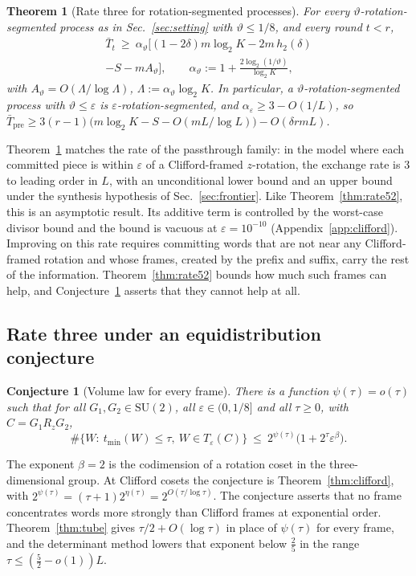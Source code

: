\documentclass[aps,prx,twocolumn,superscriptaddress,nofootinbib,longbibliography]{revtex4-2}
\theoremstyle{plain}
\newtheorem{theorem}{Theorem}
\newtheorem{conjecture}{Conjecture}
\theoremstyle{definition}
\theoremstyle{remark}
\newcommand{\Tpre}{T_{\mathrm{pre}}}
\newcommand{\SU}{\mathrm{SU}(2)}
\begin{document}
\begin{theorem}[Rate three for rotation-segmented processes]\label{thm:rate3seg}
For every $\vartheta$-rotation-segmented process as in Sec.~\ref{sec:setting} with $\vartheta\le1/8$, and every round $t<r$,
\begin{multline}\label{eq:rate3seg}
\bar T_t\ \ge\ \alpha_\vartheta\big[(1-2\delta)m\log_2K-2m\,h_2(\delta)\\-S-mA_\vartheta\big],\qquad\alpha_\vartheta:=1+\frac{2\log_2(1/\vartheta)}{\log_2K},
\end{multline}
with $A_\vartheta=O(\Lambda/\log\Lambda)$, $\Lambda:=\alpha_\vartheta\log_2K$. In particular, a $\vartheta$-rotation-segmented process with $\vartheta\le\varepsilon$ is $\varepsilon$-rotation-segmented, and $\alpha_\varepsilon\ge3-O(1/L)$, so $\bar\Tpre\ge3(r-1)\big(m\log_2K-S-O(mL/\log L)\big)-O(\delta rmL)$.
\end{theorem}
Theorem~\ref{thm:rate3seg} matches the rate of the passthrough family: in the model where each committed piece is within $\varepsilon$ of a Clifford-framed $z$-rotation, the exchange rate is $3$ to leading order in $L$, with an unconditional lower bound and an upper bound under the synthesis hypothesis of Sec.~\ref{sec:frontier}. Like Theorem~\ref{thm:rate52}, this is an asymptotic result. Its additive term is controlled by the worst-case divisor bound and the bound is vacuous at $\varepsilon=10^{-10}$ (Appendix~\ref{app:clifford}). Improving on this rate requires committing words that are not near any Clifford-framed rotation and whose frames, created by the prefix and suffix, carry the rest of the information. Theorem~\ref{thm:rate52} bounds how much such frames can help, and Conjecture~\ref{conj:equid} asserts that they cannot help at all.

\subsection{Rate three under an equidistribution conjecture}\label{sec:conj}


\begin{conjecture}[Volume law for every frame]\label{conj:equid}
There is a function $\psi(\tau)=o(\tau)$ such that for all $G_1,G_2\in\SU$, all $\varepsilon\in(0,1/8]$ and all $\tau\ge0$, with $C=G_1R_zG_2$,
\begin{equation}\label{eq:conj}
\#\{W:\ t_{\min}(W)\le\tau,\ W\in T_\varepsilon(C)\}\ \le\ 2^{\psi(\tau)}\big(1+2^\tau\varepsilon^{\beta}\big).
\end{equation}
\end{conjecture}
The exponent $\beta=2$ is the codimension of a rotation coset in the three-dimensional group. At Clifford cosets the conjecture is Theorem~\ref{thm:clifford}, with $2^{\psi(\tau)}=(\tau+1)2^{\eta(\tau)}=2^{O(\tau/\log\tau)}$. The conjecture asserts that no frame concentrates words more strongly than Clifford frames at exponential order. Theorem~\ref{thm:tube} gives $\tau/2+O(\log\tau)$ in place of $\psi(\tau)$ for every frame, and the determinant method lowers that exponent below $\tfrac25$ in the range $\tau\le(\tfrac52-o(1))L$.
\end{document}
